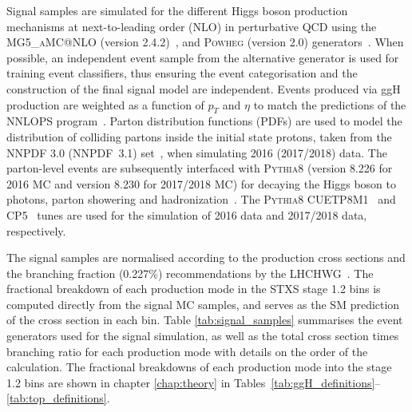 Signal samples are simulated for the different Higgs boson production mechanisms at next-to-leading order (NLO) in perturbative QCD using the \textsc{MG5\_aMC@NLO} (version 2.4.2)~\cite{Alwall:2014hca}, and \textsc{Powheg} (version 2.0) generators~\cite{Nason:2004rx,Frixione:2007vw,Alioli:2008tz,Nason:2009ai,Alioli:2010xd,Hartanto:2015uka}. When possible, an independent event sample from the alternative generator is used for training event classifiers, thus ensuring the event categorisation and the construction of the final signal model are independent. Events produced via ggH production are weighted as a function of $p_T$ and $\eta$ to match the predictions of the NNLOPS program~\cite{Hamilton:2013fea}. Parton distribution functions (PDFs) are used to model the distribution of colliding partons inside the initial state protons, taken from the NNPDF 3.0 (NNPDF~3.1) set~\cite{Ball:2014uwa,Ball:2017nwa}, when simulating 2016 (2017/2018) data. The parton-level events are subsequently interfaced with \textsc{Pythia8} (version 8.226 for 2016 MC and version 8.230 for 2017/2018 MC) for decaying the Higgs boson to photons, parton showering and hadronization~\cite{Sjostrand:2014zea}. The \textsc{Pythia8} CUETP8M1~\cite{Khachatryan:2015pea} and CP5~\cite{Sirunyan:2019dfx} tunes are used for the simulation of 2016 data and 2017/2018 data, respectively.

The signal samples are normalised according to the production cross sections and the \Hgg branching fraction (0.227\%) recommendations by the LHCHWG~\cite{deFlorian:2016spz}. The fractional breakdown of each production mode in the STXS stage 1.2 bins is computed directly from the signal MC samples, and serves as the SM prediction of the cross section in each bin. Table \ref{tab:signal_samples} summarises the event generators used for the signal simulation, as well as the total cross section times branching ratio for each production mode with details on the order of the calculation. The fractional breakdowns of each production mode into the stage 1.2 bins are shown in chapter \ref{chap:theory} in Tables~\ref{tab:ggH_definitions}--\ref{tab:top_definitions}.

